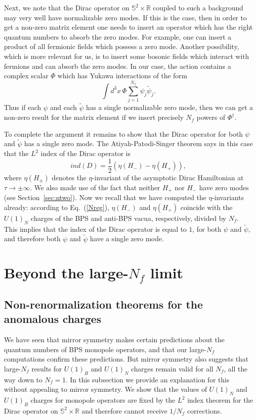\documentclass[a4paper,12pt, amsfonts, amssymb]{article}
\newcommand{\RR}{{\mathbb R}}
\renewcommand{\SS}{{\mathbb S}}
\newcommand{\ra}{\rightarrow}
\newcommand{\tpsi}{{\tilde \psi}}
\begin{document}
Next, we note that the Dirac operator on $\SS^2\times\RR$ coupled
to such a background may very well have normalizable zero modes. If this 
is the case, then in order to get a non-zero matrix element one needs
to insert an operator which has the right quantum numbers to absorb
the zero modes. For example, one can insert a product of all fermionic
fields which possess a zero mode. Another possibility, which is more
relevant for us, is to insert some bosonic fields which interact with fermions
and can absorb the zero modes. In our case, the action contains a complex 
scalar $\Phi$ which has Yukawa interactions of the form
$$
\int d^3x\, \Phi\sum_{j=1}^{N_f} \psi_j\tpsi_j.
$$
Thus if each $\psi$ and each $\tpsi$ has a single normalizable zero
mode, then we can get a non-zero result for the matrix element if we insert
precisely $N_f$ powers of $\Phi^\dag.$

To complete the argument it remains to show that the Dirac operator for both
$\psi$ and $\tpsi$ has a single zero mode. The Atiyah-Patodi-Singer
theorem says in this case that the $L^2$ index of the Dirac operator is
$$
ind(D)=\frac{1}{2}(\eta(H_-)-\eta(H_+)),
$$
where $\eta(H_\pm)$ denotes the $\eta$-invariant of the asymptotic
Dirac Hamiltonian at $\tau\ra \pm \infty.$ We also made use of the fact
that neither $H_+$ nor $H_-$ have zero modes (see Section~\ref{sec:ntwo}). 
Now we recall that we have computed the $\eta$-invariants already:
according to Eq.~(\ref{Nreg}), $\eta(H_-)$ and $\eta(H_+)$ coincide with the $U(1)_N$ charges of the BPS and anti-BPS vacua, respectively, 
divided by $N_f$. This implies that the index of the Dirac operator is 
equal to $1$, for both $\psi$ and $\tpsi,$ and therefore both $\psi$ 
and $\tpsi$ have a single zero mode.

\section{Beyond the large-$N_f$ limit}\label{sec:finitenf}

\subsection{Non-renormalization theorems for the anomalous charges}

We have seen that mirror symmetry makes certain predictions about
the quantum numbers of BPS monopole operators, and that our large-$N_f$
computations confirm these predictions. But mirror symmetry also
suggests that large-$N_f$ results for $U(1)_B$ and $U(1)_N$ charges
remain valid for all $N_f$, all the way down to $N_f=1$.
In this subsection we provide an explanation for this without appealing
to mirror symmetry. We show that the values of $U(1)_N$ and $U(1)_B$
charges for monopole operators are fixed by the $L^2$ index
theorem for the Dirac operator on $\SS^2\times\RR$ and therefore cannot
receive $1/N_f$ corrections. 
\end{document}
